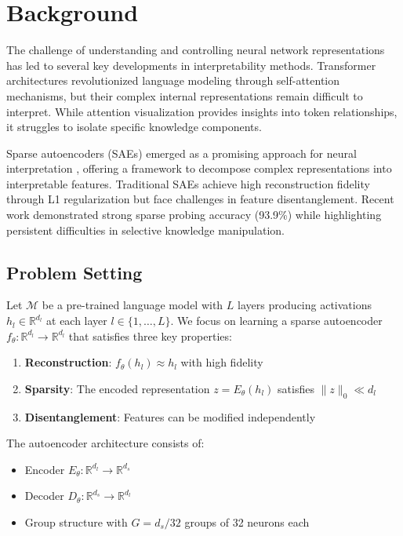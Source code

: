 \documentclass{article} %
\begin{document}
\section{Background}
\label{sec:background}

The challenge of understanding and controlling neural network representations has led to several key developments in interpretability methods. Transformer architectures \cite{vaswani2017attention} revolutionized language modeling through self-attention mechanisms, but their complex internal representations remain difficult to interpret. While attention visualization \cite{bahdanau2014neural} provides insights into token relationships, it struggles to isolate specific knowledge components.

Sparse autoencoders (SAEs) emerged as a promising approach for neural interpretation \cite{goodfellow2016deep}, offering a framework to decompose complex representations into interpretable features. Traditional SAEs achieve high reconstruction fidelity through L1 regularization but face challenges in feature disentanglement. Recent work \cite{Cunningham2023SparseAF} demonstrated strong sparse probing accuracy (93.9\%) while highlighting persistent difficulties in selective knowledge manipulation.

\subsection{Problem Setting}
Let $\mathcal{M}$ be a pre-trained language model with $L$ layers producing activations $h_l \in \mathbb{R}^{d_l}$ at each layer $l \in \{1,\ldots,L\}$. We focus on learning a sparse autoencoder $f_{\theta}: \mathbb{R}^{d_l} \rightarrow \mathbb{R}^{d_l}$ that satisfies three key properties:

\begin{enumerate}
    \item \textbf{Reconstruction}: $f_{\theta}(h_l) \approx h_l$ with high fidelity
    \item \textbf{Sparsity}: The encoded representation $z = E_{\theta}(h_l)$ satisfies $\|z\|_0 \ll d_l$
    \item \textbf{Disentanglement}: Features can be modified independently
\end{enumerate}

The autoencoder architecture consists of:
\begin{itemize}
    \item Encoder $E_{\theta}: \mathbb{R}^{d_l} \rightarrow \mathbb{R}^{d_s}$
    \item Decoder $D_{\theta}: \mathbb{R}^{d_s} \rightarrow \mathbb{R}^{d_l}$
    \item Group structure with $G = d_s/32$ groups of 32 neurons each
\end{itemize}
\end{document}
